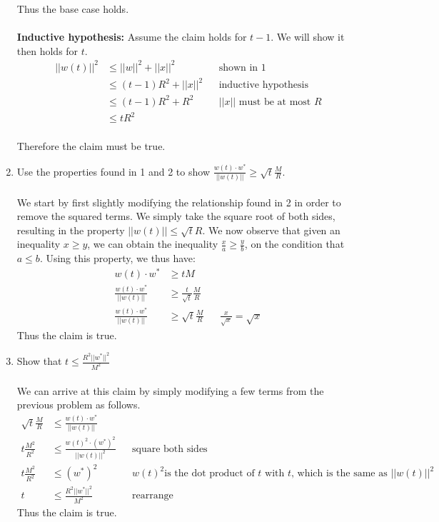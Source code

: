 \documentclass{article}
\begin{document}
\begin{enumerate}
	Thus the base case holds.
	\\ \\ \textbf{Inductive hypothesis: } Assume the claim holds for $t-1$. We will show it then holds for $t$.
	\begin{align}
	||w(t)||^2 &\leq ||w||^2 + ||x||^2 && \text{shown in 1} \\
	&\leq (t-1)R^2 + ||x||^2 && \text{inductive hypothesis} \\
	&\leq (t-1)R^2 + R^2 && \text{$||x||$ must be at most $R$} \\
	&\leq tR^2
	\end{align}
	\\ Therefore the claim must be true.
	\item Use the properties found in 1 and 2 to show $\frac{w(t)\cdot w^*}{||w(t)||} \geq \sqrt{t}\frac{M}{R}.$
	\\\\ We start by first slightly modifying the relationship found in 2 in order to remove the squared terms. We simply take the square root of both sides, resulting in the property $||w(t)|| \leq \sqrt{t}R$. We now observe that given an inequality $x \geq y$, we can obtain the inequality $\frac{x}{a} \geq  \frac{y}{b}$, on the condition that $a \leq b$. Using this property, we thus have:
	\begin{align}
	w(t)\cdot w^* &\geq tM \\
	\frac{w(t)\cdot w^*}{||w(t)||} &\geq \frac{t}{\sqrt{t}} \frac{M}{R} \\
	\frac{w(t)\cdot w^*}{||w(t)||} &\geq \sqrt{t} \frac{M}{R} && \frac{x}{\sqrt{x}} = \sqrt{x}
	\end{align}
	Thus the claim is true.
	\item Show that $t \leq \frac{R^2||w^*||^2}{M^2}$
	\\\\ We can arrive at this claim by simply modifying a few terms from the previous problem as follows.
	\begin{align}
	\sqrt{t} \frac{M}{R} &\leq \frac{w(t)\cdot w^*}{||w(t)||} \\
	t \frac{M^2}{R^2} &\leq \frac{w(t)^2 \cdot (w^*)^2}{||w(t)||^2} && \text{square both sides} \\
	t \frac{M^2}{R^2} &\leq (w^*)^2 && w(t)^2 \text{is the dot product of $t$ with $t$, which is the same as $||w(t)||^2$} \\
	t &\leq \frac{R^2||w^*||^2}{M^2} && \text{rearrange}
	\end{align}
	Thus the claim is true.
\end{enumerate}
	
\end{document}
